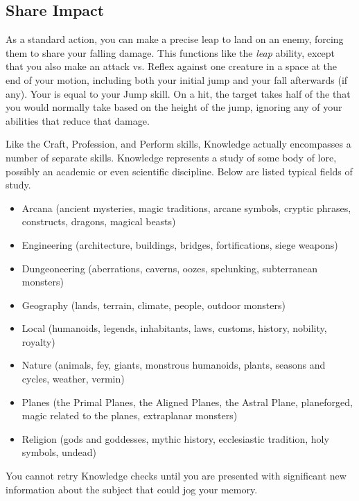     \subsection{Share Impact}
        As a standard action, you can make a precise leap to land on an enemy, forcing them to share your falling damage.
        This functions like the \textit{leap} ability, except that you also make an attack vs. Reflex against one creature in a space at the end of your motion, including both your initial jump and your fall afterwards (if any).
        Your  is equal to your Jump skill.
        On a hit, the target takes half of the  that you would normally take based on the height of the jump, ignoring any of your abilities that reduce that damage.

\newpage
{}
        Like the Craft, Profession, and Perform skills, Knowledge actually encompasses a number of separate skills. Knowledge represents a study of some body of lore, possibly an academic or even scientific discipline. Below are listed typical fields of study.
        \begin{itemize}
            \item Arcana (ancient mysteries, magic traditions, arcane symbols,
                cryptic phrases, constructs, dragons, magical beasts)
            \item Engineering (architecture, buildings, bridges, fortifications, siege weapons)
            \item Dungeoneering (aberrations, caverns, oozes, spelunking, subterranean monsters)
            \item Geography (lands, terrain, climate, people, outdoor monsters)
            \item Local (humanoids, legends, inhabitants, laws, customs, history, nobility, royalty)
            \item Nature (animals, fey, giants, monstrous humanoids, plants, seasons and cycles, weather, vermin)
            \item Planes (the Primal Planes, the Aligned Planes, the Astral Plane,
                planeforged, magic related to the planes, extraplanar monsters)
            \item Religion (gods and goddesses, mythic history, ecclesiastic tradition, holy symbols, undead)
        \end{itemize}

        You cannot retry Knowledge checks until you are presented with significant new information about the subject that could jog your memory.

